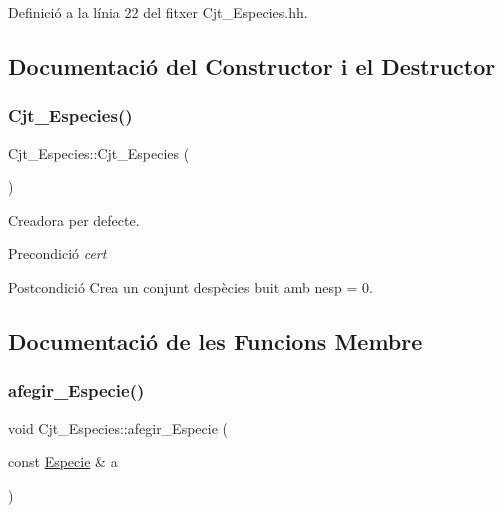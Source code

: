 Definició a la línia 22 del fitxer Cjt\+\_\+\+Especies.\+hh.



\subsection{Documentació del Constructor i el Destructor}
\mbox{\label{class_cjt___especies_ae423b9d5a456158136c17d9210c90c2e}} 
\subsubsection{\texorpdfstring{Cjt\+\_\+\+Especies()}{Cjt\_Especies()}}
{\footnotesize\ttfamily Cjt\+\_\+\+Especies\+::\+Cjt\+\_\+\+Especies (\begin{DoxyParamCaption}{ }\end{DoxyParamCaption})}



Creadora per defecte. 

\begin{DoxyPrecond}{Precondició}
{\itshape cert} 
\end{DoxyPrecond}
\begin{DoxyPostcond}{Postcondició}
Crea un conjunt d\textquotesingle{}espècies buit amb nesp = 0. 
\end{DoxyPostcond}


\subsection{Documentació de les Funcions Membre}
\mbox{\label{class_cjt___especies_a4ac8e8ed749e7e33b0c84da57226081c}} 
\subsubsection{\texorpdfstring{afegir\+\_\+\+Especie()}{afegir\_Especie()}}
{\footnotesize\ttfamily void Cjt\+\_\+\+Especies\+::afegir\+\_\+\+Especie (\begin{DoxyParamCaption}\item[{const \hyperlink{class_especie}{Especie} \&}]{a }\end{DoxyParamCaption})}




